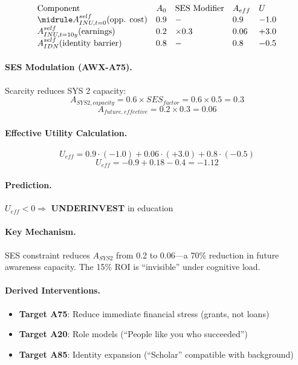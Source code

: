 \begin{equation}
\begin{array}{lclll}
\text{Component} & A_0 & \text{SES Modifier} & A_{eff} & U \\
\midrule
A^{self}_{INU,t=0}(\text{opp. cost}) & 0.9 & - & 0.9 & -1.0 \\
A^{self}_{INU,t=10y}(\text{earnings}) & 0.2 & \times 0.3 & 0.06 & +3.0 \\
A^{self}_{IDN}(\text{identity barrier}) & 0.8 & - & 0.8 & -0.5
\end{array}
\end{equation}

\paragraph{SES Modulation (AWX-A75).}
Scarcity reduces SYS 2 capacity:
\begin{equation}
A_{SYS2,capacity} = 0.6 \times SES_{factor} = 0.6 \times 0.5 = 0.3
\end{equation}
\begin{equation}
A_{future,effective} = 0.2 \times 0.3 = 0.06
\end{equation}

\paragraph{Effective Utility Calculation.}
\begin{equation}
U_{eff} = 0.9 \cdot (-1.0) + 0.06 \cdot (+3.0) + 0.8 \cdot (-0.5)
\end{equation}
\begin{equation}
\boxed{U_{eff} = -0.9 + 0.18 - 0.4 = \mathbf{-1.12}}
\end{equation}

\paragraph{Prediction.}
$U_{eff} < 0 \Rightarrow$ \textbf{UNDERINVEST} in education

\paragraph{Key Mechanism.}
SES constraint reduces $A_{SYS2}$ from 0.2 to 0.06---a 70\% reduction in future awareness capacity. The 15\% ROI is ``invisible'' under cognitive load.

\paragraph{Derived Interventions.}
\begin{itemize}
    \item \textbf{Target A75}: Reduce immediate financial stress (grants, not loans)
    \item \textbf{Target A20}: Role models (``People like you who succeeded'')
    \item \textbf{Target A85}: Identity expansion (``Scholar'' compatible with background)
\end{itemize}


